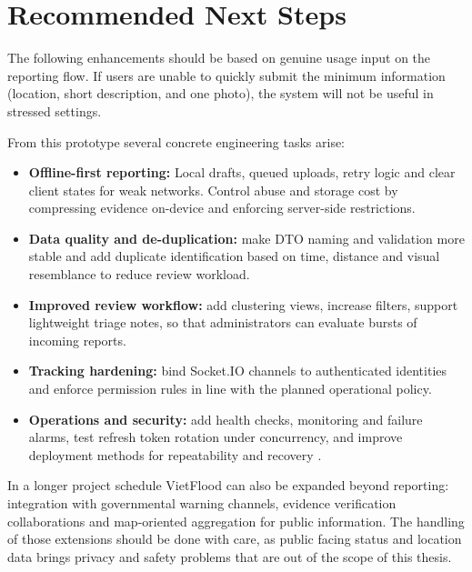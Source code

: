 \section{Recommended Next Steps}

The following enhancements should be based on genuine usage input on the reporting flow. If users are unable to quickly submit the minimum information (location, short description, and one photo), the system will not be useful in stressed settings.

From this prototype several concrete engineering tasks arise:
\begin{itemize}[leftmargin=1.2em]
    \item \textbf{Offline-first reporting:} Local drafts, queued uploads, retry logic and clear client states for weak networks. Control abuse and storage cost by compressing evidence on-device and enforcing server-side restrictions.
    \item \textbf{Data quality and de-duplication:} make DTO naming and validation more stable and add duplicate identification based on time, distance and visual resemblance to reduce review workload.
    \item \textbf{Improved review workflow:} add clustering views, increase filters, support lightweight triage notes, so that administrators can evaluate bursts of incoming reports.
    \item \textbf{Tracking hardening:} bind Socket.IO channels to authenticated identities and enforce permission rules in line with the planned operational policy.
    \item \textbf{Operations and security:} add health checks, monitoring and failure alarms, test refresh token rotation under concurrency, and improve deployment methods for repeatability and recovery \cite{humble2010continuousDelivery,kim2016devopsHandbook,dockerComposeDocs}.
\end{itemize}

In a longer project schedule VietFlood can also be expanded beyond reporting: integration with governmental warning channels, evidence verification collaborations and map-oriented aggregation for public information. The handling of those extensions should be done with care, as public facing status and location data brings privacy and safety problems that are out of the scope of this thesis.
